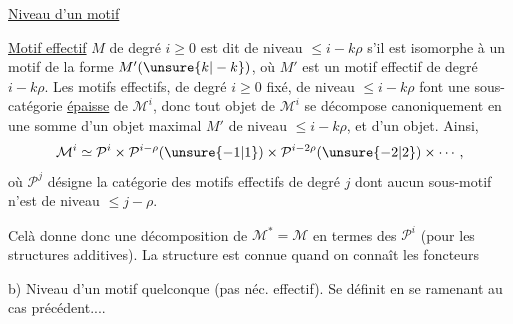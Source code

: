
\uline{Niveau d'un motif}

 \uline{Motif effectif} $M$ de degré $i\geq0$ est dit de niveau $\leq i-k\rho$ s'il est isomorphe à un motif de la forme $M'(\unsure{k|-k})$, où $M'$ est un motif effectif de degré $i-k\rho$.
Les motifs effectifs, de degré $i\geq0$ fixé, de niveau $\leq i-k\rho$ font une sous-catégorie \uline{épaisse} de $\mathcal M^i$, donc tout objet de $\mathcal M^i$ se décompose canoniquement en une somme d'un objet maximal $M'$ de niveau $\leq i-k\rho$, et d'un objet. 
Ainsi,
\[
\mathcal M^i\simeq\mathcal P^i\times\mathcal P^{i-\rho}(\unsure{-1|1})\times\mathcal P^{i-2\rho}(\unsure{-2|2})\times\cdots,
\]
où $\mathcal P^j$ désigne la catégorie des motifs effectifs de degré $j$  dont aucun sous-motif n'est de niveau $\leq j-\rho$.

Celà donne donc une décomposition de $\mathcal M^{*}=\mathcal M$ en termes des $\mathcal P^i$ (pour les structures additives). La structure  est connue quand on connaît les foncteurs

b) Niveau d'un motif quelconque (pas néc. effectif).
Se définit en se ramenant au cas précédent....
